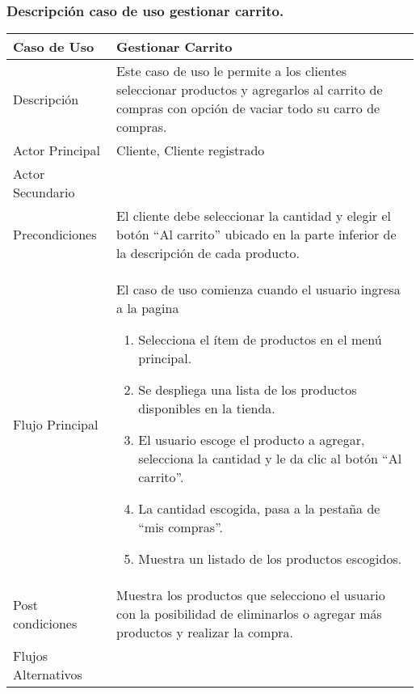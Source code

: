 \documentclass[12pt,a4paper]{article}
\begin{document}
\subsubsection*{Descripción caso de uso gestionar carrito.}
\begin{table}[h]
        \centering
        \begin{tabular}{| p{3cm}| p{11cm} |} 
        \hline  
        Caso de Uso         &    \textbf{ Gestionar Carrito}   \\ 
        \hline
        Descripción         &    Este caso de uso le permite a los clientes seleccionar productos y agregarlos al carrito de compras con opción de vaciar todo su carro de compras.   \\ 
        \hline
        Actor Principal     &   Cliente, Cliente registrado   \\ 
        \hline
        Actor Secundario    &       \\ 
        \hline
        Precondiciones      &  El cliente debe seleccionar la cantidad y elegir el botón “Al carrito” ubicado en la parte inferior de la descripción de cada producto.   	\\
        \hline
        Flujo Principal     &   El caso de uso comienza cuando el usuario ingresa a la pagina 

            \begin{enumerate}
                \item Selecciona el ítem de productos en el menú principal.
                \item Se despliega una lista de los productos disponibles en la tienda.
                \item El usuario escoge el producto a agregar, selecciona la cantidad y le da clic al botón “Al carrito”.
                \item La cantidad escogida, pasa a la pestaña de “mis compras”.
                \item Muestra un listado de los productos escogidos.
            \end{enumerate}
        \\  
        \hline
        Post condiciones    &    Muestra los productos que selecciono el usuario con la posibilidad de eliminarlos o agregar más productos y realizar la compra.   \\  
        \hline
        Flujos Alternativos &       \\  
        \hline
        \end{tabular}
    \end{table}
    
\end{document}
